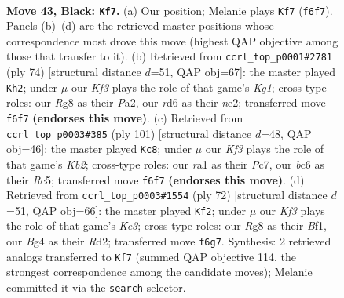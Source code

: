 \documentclass[11pt]{article}
\begin{document}
\clearpage

\begin{figure}[p]\centering
\begin{subfigure}{0.46\textwidth}\centering
\resizebox{\linewidth}{!}{%
\newchessgame
\chessboard[
  setfen={6r1/r7/p1BR1k2/B5p1/5pb1/PP6/1K5P/R5N1 b - - 0 43},
  showmover=false,
  pgfstyle=straightmove, color=movearrow, markmove={f6-f7}
]}
\caption{}
\end{subfigure}\hfill
\begin{subfigure}{0.46\textwidth}\centering
\resizebox{\linewidth}{!}{%
\newchessgame
\chessboard[
  setfen={5r2/1R1B1k1p/8/2rp1P1p/8/5R2/P3n1P1/6K1 w - - 2 38},
  showmover=false,
  pgfstyle=straightmove, color=movearrow, markmove={g1-h2}
]}
\caption{}
\end{subfigure}
\\[4pt]
\begin{subfigure}{0.46\textwidth}\centering
\resizebox{\linewidth}{!}{%
\newchessgame
\chessboard[
  setfen={8/1kp4p/p4bp1/2r5/1R3B2/1P6/P4PKP/8 b - - 5 51},
  showmover=false,
  pgfstyle=straightmove, color=movearrow, markmove={b7-c8}
]}
\caption{}
\end{subfigure}\hfill
\begin{subfigure}{0.46\textwidth}\centering
\resizebox{\linewidth}{!}{%
\newchessgame
\chessboard[
  setfen={2r5/4k1pp/1Rb2p2/4r3/2P5/p3K1P1/P2R3P/5B2 w - - 0 37},
  showmover=false,
  pgfstyle=straightmove, color=movearrow, markmove={e3-f2}
]}
\caption{}
\end{subfigure}
\caption{\textbf{Move 43, Black: \texttt{Kf7}.} (a) Our position; Melanie plays \texttt{Kf7} (\texttt{f6f7}). Panels (b)--(d) are the retrieved master positions whose correspondence most drove this move (highest QAP objective among those that transfer to it). (b) Retrieved from \texttt{ccrl\_top\_p0001\#2781} (ply 74) [structural distance $d$=51, QAP obj=67]: the master played \texttt{Kh2}; under $\mu$ our \emph{Kf3} plays the role of that game's \emph{Kg1}; cross-type roles: our \emph{R}g8 as their \emph{P}a2, our \emph{r}d6 as their \emph{n}e2; transferred move \texttt{f6f7} \textbf{(endorses this move)}. (c) Retrieved from \texttt{ccrl\_top\_p0003\#385} (ply 101) [structural distance $d$=48, QAP obj=46]: the master played \texttt{Kc8}; under $\mu$ our \emph{Kf3} plays the role of that game's \emph{Kb2}; cross-type roles: our \emph{r}a1 as their \emph{P}c7, our \emph{b}c6 as their \emph{R}c5; transferred move \texttt{f6f7} \textbf{(endorses this move)}. (d) Retrieved from \texttt{ccrl\_top\_p0003\#1554} (ply 72) [structural distance $d$=51, QAP obj=66]: the master played \texttt{Kf2}; under $\mu$ our \emph{Kf3} plays the role of that game's \emph{Ke3}; cross-type roles: our \emph{R}g8 as their \emph{B}f1, our \emph{B}g4 as their \emph{R}d2; transferred move \texttt{f6g7}. Synthesis: 2 retrieved analogs transferred to \texttt{Kf7} (summed QAP objective 114, the strongest correspondence among the candidate moves); Melanie committed it via the \texttt{search} selector.}
\label{fig:thought-m85}
\end{figure}
\end{document}
